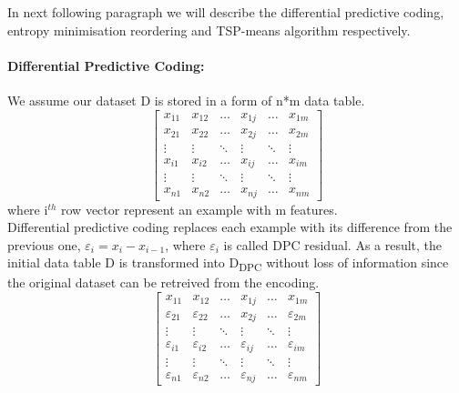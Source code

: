 In next following paragraph we will describe the differential predictive coding, entropy minimisation reordering and TSP-means algorithm respectively.
\paragraph{Differential Predictive Coding:}
We assume our dataset D is stored in a form of n*m data table.
\[
\begin{bmatrix}
x_{11} & x_{12} & \dots & x_{1j} & \dots & x_{1m} \\
x_{21} & x_{22} & \dots & x_{2j} & \dots & x_{2m} \\
\vdots & \vdots & \ddots & \vdots & \ddots & \vdots \\
x_{i1} & x_{i2} & \dots & x_{ij} & \dots & x_{im} \\
\vdots & \vdots & \ddots & \vdots & \ddots & \vdots \\
x_{n1} & x_{n2} & \dots & x_{nj} & \dots & x_{nm}
\end{bmatrix}
\]
where i$^{th}$ row vector represent an example with m features.\\
Differential predictive coding replaces each example with its difference from the previous one, $\varepsilon_{i} = x_{i} - x_{i-1}$, where $\varepsilon_{i}$ is called DPC residual. As a result, the initial data table D is transformed into D\textsubscript{DPC} without loss of information since the original dataset can be retreived from the encoding.
\[
\begin{bmatrix}
x_{11} & x_{12} & \dots & x_{1j} & \dots & x_{1m} \\
\varepsilon_{21} & \varepsilon_{22} & \dots & x_{2j} & \dots & \varepsilon_{2m} \\
\vdots & \vdots & \ddots & \vdots & \ddots & \vdots \\
\varepsilon_{i1} & \varepsilon_{i2} & \dots & \varepsilon_{ij} & \dots & \varepsilon_{im} \\
\vdots & \vdots & \ddots & \vdots & \ddots & \vdots \\
\varepsilon_{n1} & \varepsilon_{n2} & \dots & \varepsilon_{nj} & \dots & \varepsilon_{nm}
\end{bmatrix}
\]
